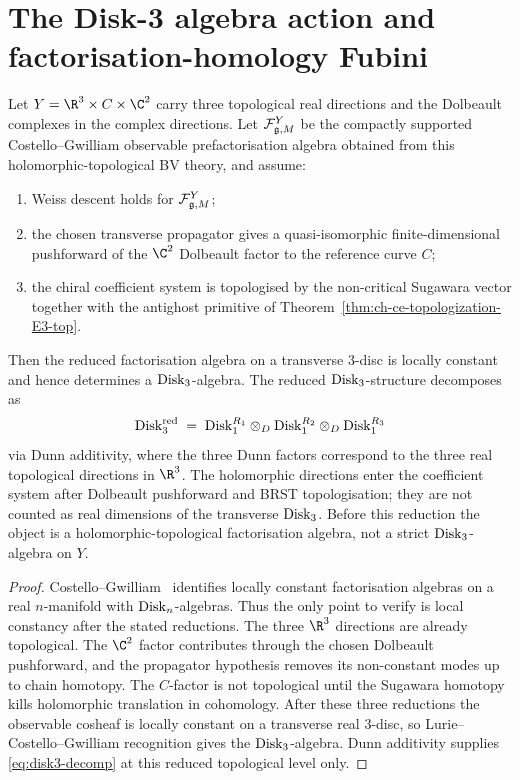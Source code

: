 \section{The Disk-3 algebra action and factorisation-homology Fubini}
\label{sec:ch-ce-disk3-fubini}

\begin{theorem}
\label{thm:ch-ce-disk3-algebra}
%
Let $Y=\R^3\times C\times\C^2$ carry three topological real
directions and the Dolbeault complexes in the complex directions. Let
$\mathcal{F}^Y_{\mathfrak{g},M}$ be the compactly supported Costello--Gwilliam
observable prefactorisation algebra obtained from this
holomorphic-topological BV theory, and assume:
\begin{enumerate}[label=\textup{(\roman*)}]
\item Weiss descent holds for $\mathcal{F}^Y_{\mathfrak{g},M}$;
\item the chosen transverse propagator gives a quasi-isomorphic
finite-dimensional pushforward of the $\C^2$ Dolbeault factor to the
reference curve $C$;
\item the chiral coefficient system is topologised by the non-critical
Sugawara vector together with the antighost primitive of
Theorem~\ref{thm:ch-ce-topologization-E3-top}.
\end{enumerate}
Then the reduced factorisation algebra on a transverse $3$-disc is
locally constant and hence determines a $\mathrm{Disk}_3$-algebra. The reduced
$\mathrm{Disk}_3$-structure decomposes as
\begin{equation}
\label{eq:disk3-decomp}
\mathrm{Disk}_3^{\mathrm{red}}
\;=\;
\mathrm{Disk}_1^{R_1}\otimes_D \mathrm{Disk}_1^{R_2}\otimes_D \mathrm{Disk}_1^{R_3}
\end{equation}
via Dunn additivity, where the three Dunn factors correspond to
the three real topological directions in $\R^3$. The holomorphic
directions enter the coefficient system after Dolbeault pushforward
and BRST topologisation; they are not counted as real dimensions of
the transverse $\mathrm{Disk}_3$.
Before this reduction the object is a holomorphic-topological
factorisation algebra, not a strict $\mathrm{Disk}_3$-algebra on $Y$.
\end{theorem}

\begin{proof}
Costello--Gwilliam~\cite[Thm.\,4.4.1]{CG17} identifies locally
constant factorisation algebras on a real $n$-manifold with
$\mathrm{Disk}_n$-algebras. Thus the only point to verify is local constancy
after the stated reductions. The three $\R^3$ directions are already
topological. The $\C^2$ factor contributes through the chosen
Dolbeault pushforward, and the propagator hypothesis removes its
non-constant modes up to chain homotopy. The $C$-factor is
not topological until the Sugawara homotopy kills holomorphic
translation in cohomology. After these three reductions the observable
cosheaf is locally constant on a transverse real $3$-disc, so
Lurie--Costello--Gwilliam recognition gives the $\mathrm{Disk}_3$-algebra.
Dunn additivity supplies \eqref{eq:disk3-decomp} at this reduced
topological level only.
\end{proof}

